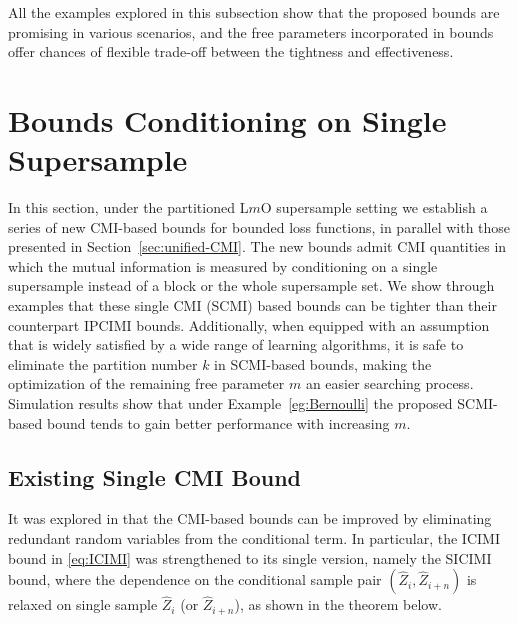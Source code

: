 \documentclass[onecolumn,romanappendices,10pt]{IEEEtran}
\begin{document}
	All the examples explored in this subsection show that the proposed bounds are promising in various scenarios, and the free parameters incorporated in bounds offer chances of flexible trade-off between the tightness and effectiveness.
	
	\section{Bounds Conditioning on Single Supersample}\label{sec:SCMI-bounds}
	In this section, under the partitioned L$m$O supersample setting we establish a series of new CMI-based bounds for bounded loss functions, in parallel with those presented in Section~\ref{sec:unified-CMI}. The new bounds admit CMI quantities in which the mutual information is measured by conditioning on a single supersample instead of a block or the whole supersample set. We show through examples that these single CMI (SCMI) based bounds can be tighter than their counterpart IPCIMI bounds. Additionally, when equipped with an assumption that is widely satisfied by a wide range of learning algorithms, it is safe to eliminate the partition number $k$ in SCMI-based bounds, making the optimization of the remaining free parameter $m$ an easier searching process. Simulation results show that under Example~\ref{eg:Bernoulli} the proposed SCMI-based bound tends to gain better performance with increasing $m$.
	\subsection{Existing Single CMI Bound}
	It was explored in \cite{zhou2022individually, dongexactly} that the CMI-based bounds can be improved by eliminating redundant random variables from the conditional term. In particular, the ICIMI bound in \eqref{eq:ICIMI} was strengthened to its single version, namely the SICIMI bound, where the dependence on the conditional sample pair $(\hat{Z}_i, \hat{Z}_{i+n})$ is relaxed on single sample $\hat{Z}_i$ (or $\hat{Z}_{i+n}$), as shown in the theorem below. 
	
\end{document}
